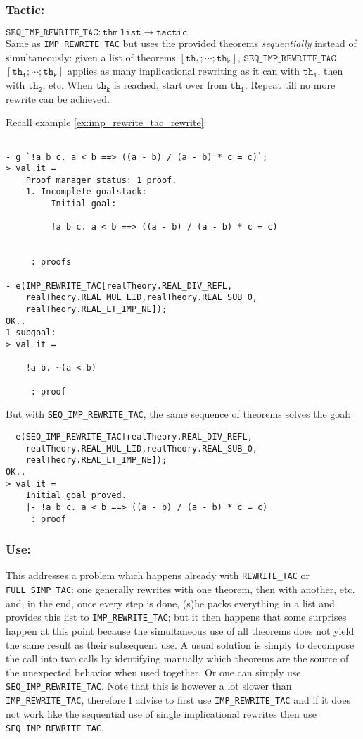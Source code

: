 \documentclass{llncs}
\newcommand*\IMPREWRITETAC{\texttt{IMP\_REWRITE\_TAC}\xspace}
\newcommand*\SEQIMPREWRITETAC{\texttt{SEQ\_IMP\_REWRITE\_TAC}\xspace}
\newcommand*\REWRITETAC{\texttt{REWRITE\_TAC}\xspace}
\newcommand*\SIMPTAC{\texttt{FULL\_SIMP\_TAC}\xspace}
\begin{document}
    \subsubsection{Tactic:}
		$\mathtt{\SEQIMPREWRITETAC: thm\ list \to tactic}$\\
    Same as \IMPREWRITETAC but uses the provided theorems \emph{sequentially} instead of simultaneously:
    given a list of theorems $\mathtt{[th_1;\cdots;th_k]}$,
    $\mathtt{\SEQIMPREWRITETAC}$ $\mathtt{[th_1;\cdots;th_k]}$ applies as many implicational rewriting
    as it can with $\mathtt{th_1}$, then with $\mathtt{th_2}$, etc.
		When $\mathtt{th_k}$ is reached, start over from $\mathtt{th_1}$.
		Repeat till no more rewrite can be achieved.

    \begin{example}
      Recall example \ref{ex:imp_rewrite_tac_rewrite}:
        \begin{verbatim}

- g `!a b c. a < b ==> ((a - b) / (a - b) * c = c)`;
> val it =
    Proof manager status: 1 proof.
    1. Incomplete goalstack:
         Initial goal:
    
         !a b c. a < b ==> ((a - b) / (a - b) * c = c)
    
    
     : proofs
        
- e(IMP_REWRITE_TAC[realTheory.REAL_DIV_REFL,
    realTheory.REAL_MUL_LID,realTheory.REAL_SUB_0,
    realTheory.REAL_LT_IMP_NE]);
OK..
1 subgoal:
> val it =
    
    !a b. ~(a < b)
    
     : proof \end{verbatim}
        But with \SEQIMPREWRITETAC, the same sequence of theorems solves the goal:
        \begin{verbatim}
  e(SEQ_IMP_REWRITE_TAC[realTheory.REAL_DIV_REFL,
    realTheory.REAL_MUL_LID,realTheory.REAL_SUB_0,
    realTheory.REAL_LT_IMP_NE]);
OK..
> val it =
    Initial goal proved.
    |- !a b c. a < b ==> ((a - b) / (a - b) * c = c)
     : proof \end{verbatim}
      \end{example}

    \subsubsection{Use:}
    This addresses a problem which happens already with \REWRITETAC or \SIMPTAC:
    one generally rewrites with one theorem, then with another, etc.
    and, in the end, once every step is done, (s)he packs everything in a list and provides this list
    to \IMPREWRITETAC; but it then happens that some surprises happen at this point
    because the simultaneous use of all theorems does not yield the same result as their subsequent use.
    A usual solution is simply to decompose the call into two calls by identifying manually
    which theorems are the source of the unexpected behavior when used together.
    Or one can simply use \SEQIMPREWRITETAC.
    Note that this is however a lot slower than \IMPREWRITETAC,
    therefore I advise to first use \IMPREWRITETAC and if it does not work like the sequential use of
    single implicational rewrites then use \SEQIMPREWRITETAC.
\end{document}
